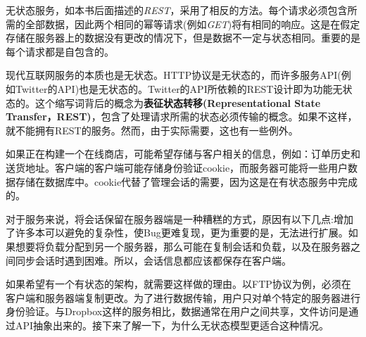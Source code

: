 无状态服务，如本书后面描述的\textit{REST}，采用了相反的方法。每个请求必须包含所需的全部数据，因此两个相同的幂等请求(例如\textit{GET})将有相同的响应。这是在假定存储在服务器上的数据没有更改的情况下，但是数据不一定与状态相同。重要的是每个请求都是自包含的。

现代互联网服务的本质也是无状态。HTTP协议是无状态的，而许多服务API(例如Twitter的API)也是无状态的。Twitter的API所依赖的REST设计即为功能无状态的。这个缩写词背后的概念为\textbf{表征状态转移(Representational State Transfer，REST)}，包含了处理请求所需的状态必须传输的概念。如果不这样，就不能拥有REST的服务。然而，由于实际需要，这也有一些例外。

如果正在构建一个在线商店，可能希望存储与客户相关的信息，例如：订单历史和送货地址。客户端的客户端可能存储身份验证cookie，而服务器可能将一些用户数据存储在数据库中。cookie代替了管理会话的需要，因为这是在有状态服务中完成的。

对于服务来说，将会话保留在服务器端是一种糟糕的方式，原因有以下几点:增加了许多本可以避免的复杂性，使Bug更难复现，更为重要的是，无法进行扩展。如果想要将负载分配到另一个服务器，那么可能在复制会话和负载，以及在服务器之间同步会话时遇到困难。所以，会话信息都应该都保存在客户端。

如果希望有一个有状态的架构，就需要这样做的理由。以FTP协议为例，必须在客户端和服务器端复制更改。为了进行数据传输，用户只对单个特定的服务器进行身份验证。与Dropbox这样的服务相比，数据通常在用户之间共享，文件访问是通过API抽象出来的。接下来了解一下，为什么无状态模型更适合这种情况。












